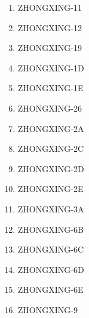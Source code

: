 \begin{multicols}{2}
\begin{enumerate}
\begin{enumerate}
    \item ZHONGXING-11
    \item ZHONGXING-12
    \item ZHONGXING-19
    \item ZHONGXING-1D
    \item ZHONGXING-1E
    \item ZHONGXING-26
    \item ZHONGXING-2A
    \item ZHONGXING-2C
    \item ZHONGXING-2D
    \item ZHONGXING-2E
    \item ZHONGXING-3A
    \item ZHONGXING-6B
    \item ZHONGXING-6C
    \item ZHONGXING-6D
    \item ZHONGXING-6E
    \item ZHONGXING-9
  \end{enumerate}
\end{enumerate}
\end{multicols}

\endinput  %
